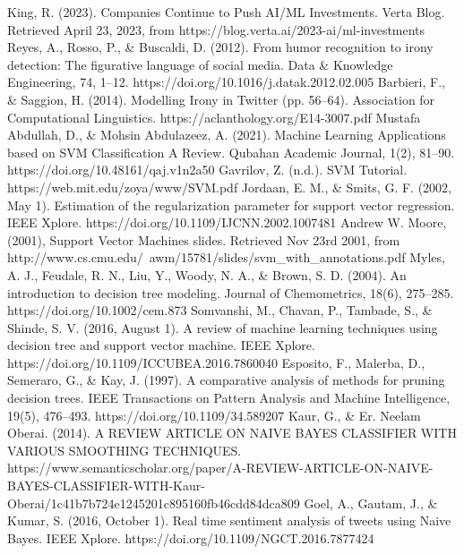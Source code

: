 \documentclass[a4paper]{article}
\begin{document}
\begin{thebibliography}{}
    King, R. (2023). Companies Continue to Push AI/ML Investments. Verta Blog. Retrieved April 23, 2023, from https://blog.verta.ai/2023-ai/ml-investments
    Reyes, A., Rosso, P., \& Buscaldi, D. (2012). From humor recognition to irony detection: The figurative language of social media. Data \& Knowledge Engineering, 74, 1–12. https://doi.org/10.1016/j.datak.2012.02.005
    Barbieri, F., \& Saggion, H. (2014). Modelling Irony in Twitter (pp. 56–64). Association for Computational Linguistics. https://aclanthology.org/E14-3007.pdf
    Mustafa Abdullah, D., \& Mohsin Abdulazeez, A. (2021). Machine Learning Applications based on SVM Classification A Review. Qubahan Academic Journal, 1(2), 81–90. https://doi.org/10.48161/qaj.v1n2a50
    Gavrilov, Z. (n.d.). SVM Tutorial. https://web.mit.edu/zoya/www/SVM.pdf
    Jordaan, E. M., \& Smits, G. F. (2002, May 1). Estimation of the regularization parameter for support vector regression. IEEE Xplore. https://doi.org/10.1109/IJCNN.2002.1007481
    Andrew W. Moore, (2001), Support Vector Machines slides. Retrieved Nov 23rd 2001, from http://www.cs.cmu.edu/~awm/15781/slides/svm\_with\_annotations.pdf
    Myles, A. J., Feudale, R. N., Liu, Y., Woody, N. A., \& Brown, S. D. (2004). An introduction to decision tree modeling. Journal of Chemometrics, 18(6), 275–285. https://doi.org/10.1002/cem.873
    Somvanshi, M., Chavan, P., Tambade, S., \& Shinde, S. V. (2016, August 1). A review of machine learning techniques using decision tree and support vector machine. IEEE Xplore. https://doi.org/10.1109/ICCUBEA.2016.7860040
    Esposito, F., Malerba, D., Semeraro, G., \& Kay, J. (1997). A comparative analysis of methods for pruning decision trees. IEEE Transactions on Pattern Analysis and Machine Intelligence, 19(5), 476–493. https://doi.org/10.1109/34.589207
    Kaur, G., \& Er. Neelam Oberai. (2014). A REVIEW ARTICLE ON NAIVE BAYES CLASSIFIER WITH VARIOUS SMOOTHING TECHNIQUES. https://www.semanticscholar.org/paper/A-REVIEW-ARTICLE-ON-NAIVE-BAYES-CLASSIFIER-WITH-Kaur-Oberai/1c41b7b724e1245201c895160fb46cdd84dca809
    Goel, A., Gautam, J., \& Kumar, S. (2016, October 1). Real time sentiment analysis of tweets using Naive Bayes. IEEE Xplore. https://doi.org/10.1109/NGCT.2016.7877424

\end{thebibliography}
\end{document}
